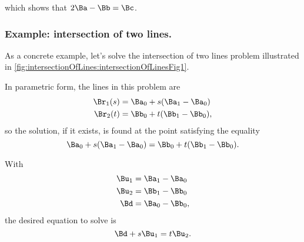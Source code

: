 which shows that \( 2 \Ba - \Bb = \Bc \).
\subsubsection{Example: intersection of two lines.}
As a concrete example, let's solve the intersection of two lines problem illustrated in \cref{fig:intersectionOfLines:intersectionOfLinesFig1}.

In parametric form, the lines in this problem are
\begin{equation}\label{eqn:solutionOfLinearSystem:1000}
\begin{aligned}
\Br_1(s) &= \Ba_0 + s( \Ba_1 - \Ba_0 ) \\
\Br_2(t) &= \Bb_0 + t( \Bb_1 - \Bb_0 ),
\end{aligned}
\end{equation}
so the solution, if it exists, is found at the point satisfying the equality
\begin{equation}\label{eqn:solutionOfLinearSystem:1020}
\Ba_0 + s( \Ba_1 - \Ba_0 ) = \Bb_0 + t( \Bb_1 - \Bb_0 ).
\end{equation}

With
\begin{equation}\label{eqn:solutionOfLinearSystem:1040}
\begin{aligned}
\Bu_1 &= \Ba_1 - \Ba_0 \\
\Bu_2 &= \Bb_1 - \Bb_0 \\
\Bd &= \Ba_0 - \Bb_0,
\end{aligned}
\end{equation}
the desired equation to solve is
\begin{equation}\label{eqn:solutionOfLinearSystem:1060}
\Bd + s \Bu_1 = t \Bu_2.
\end{equation}


